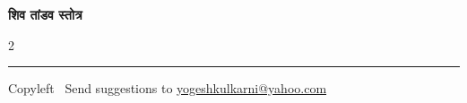 \documentclass[8pt,landscape]{article}
\begin{document}
\footnotesize


\begin{center}
\Large{\textbf{शिव तांडव स्तोत्र}}  
\end{center}

\begin{multicols}{2}

\end{multicols}

\rule{\linewidth}{0.25pt}
\scriptsize
Copyleft \textcopyleft\  Send suggestions to 
\href{http://www.yogeshkulkarni.com}{yogeshkulkarni@yahoo.com}
\end{document}
